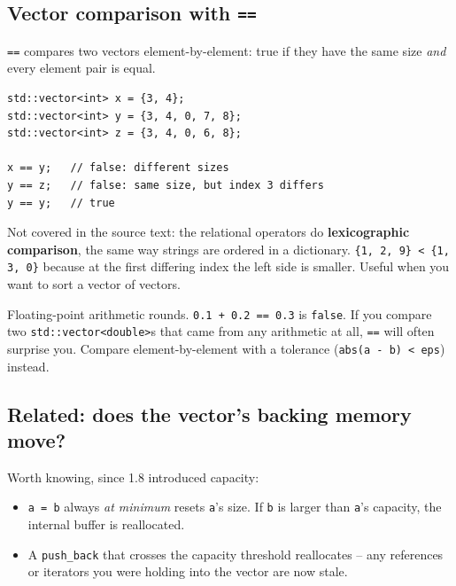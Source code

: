 \documentclass[11pt]{article}
\begin{document}
\subsection{Vector comparison with \texttt{==}}

\texttt{==} compares two vectors element-by-element: true if they
have the same size \emph{and} every element pair is equal.

\begin{lstlisting}
std::vector<int> x = {3, 4};
std::vector<int> y = {3, 4, 0, 7, 8};
std::vector<int> z = {3, 4, 0, 6, 8};

x == y;   // false: different sizes
y == z;   // false: same size, but index 3 differs
y == y;   // true
\end{lstlisting}

\begin{notebox}[\texttt{<}, \texttt{>}, \texttt{<=}, \texttt{>=} also work]
Not covered in the source text: the relational operators do
\textbf{lexicographic comparison}, the same way strings are ordered
in a dictionary. \texttt{\{1, 2, 9\} < \{1, 3, 0\}} because at the
first differing index the left side is smaller. Useful when you want
to sort a vector of vectors.
\end{notebox}

\begin{warnbox}[Never \texttt{==} floating-point vectors by accident]
Floating-point arithmetic rounds. \texttt{0.1 + 0.2 == 0.3} is
\texttt{false}. If you compare two \texttt{std::vector<double>}s that
came from any arithmetic at all, \texttt{==} will often surprise you.
Compare element-by-element with a tolerance (\texttt{abs(a - b) <
eps}) instead.
\end{warnbox}

\subsection{Related: does the vector's backing memory move?}

Worth knowing, since 1.8 introduced capacity:

\begin{itemize}
    \item \texttt{a = b} always \emph{at minimum} resets \texttt{a}'s
          size. If \texttt{b} is larger than \texttt{a}'s capacity, the
          internal buffer is reallocated.
    \item A \texttt{push\_back} that crosses the capacity threshold
          reallocates -- any references or iterators you were holding
          into the vector are now stale.
\end{itemize}
\end{document}
